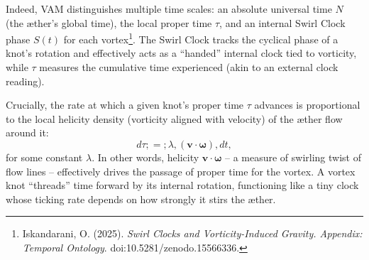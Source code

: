 Indeed, VAM distinguishes multiple time scales: an absolute universal time $N$ (the \ae ther's global time), the local proper time $\tau$, and an internal Swirl Clock phase $S(t)$ for each vortex\footnote{Iskandarani, O. (2025). \textit{Swirl Clocks and Vorticity-Induced Gravity. Appendix: Temporal Ontology}. doi:10.5281/zenodo.15566336.}. The Swirl Clock tracks the cyclical phase of a knot's rotation and effectively acts as a ``handed'' internal clock tied to vorticity, while $\tau$ measures the cumulative time experienced (akin to an external clock reading).

Crucially, the rate at which a given knot's proper time $\tau$ advances is proportional to the local helicity density (vorticity aligned with velocity) of the \ae ther flow around it:
\begin{equation}
d\tau ;=; \lambda, (\mathbf{v}\cdot\boldsymbol{\omega}), dt,
\label{eq:helicity-time}
\end{equation}
for some constant $\lambda$. In other words, helicity $\mathbf{v}\cdot\boldsymbol{\omega}$ -- a measure of swirling twist of flow lines -- effectively drives the passage of proper time for the vortex. A vortex knot ``threads'' time forward by its internal rotation, functioning like a tiny clock whose ticking rate depends on how strongly it stirs the \ae ther.
